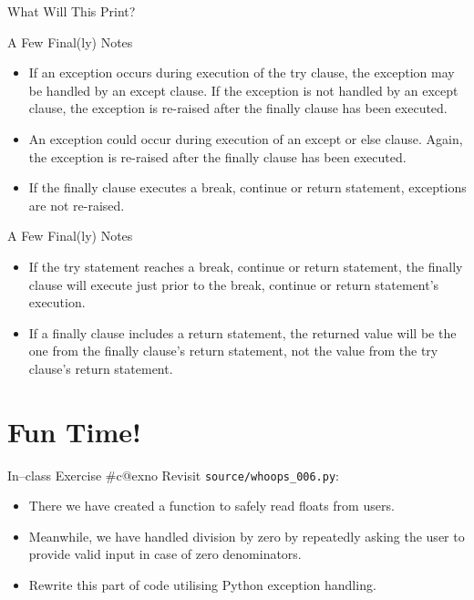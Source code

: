 \documentclass[aspectratio=169, 12pt, xcolor=table]{beamer}
\makeatletter
\newcommand{\arabicthree}[1]{\expandafter\@arabicthree\csname c@#1\endcsname}
\newcommand{\@arabicthree}[1]{\ifnum #1<100 0\fi\ifnum #1<10 0\fi\number#1}
\newcounter{exno}
\newcommand{\exno}{\stepcounter{exno}In--class Exercise \#\arabicthree{exno}}
\makeatother
\begin{document}
	\begin{frame}{What Will This Print?}
		
	\end{frame}

	\begin{frame}{A Few Final(ly) Notes}
		\begin{itemize}
			\item If an exception occurs during execution of the try clause, the exception may be handled by an except clause. If the exception is not handled by an except clause, the exception is re-raised after the finally clause has been executed.
			\item An exception could occur during execution of an except or else clause. Again, the exception is re-raised after the finally clause has been executed.
			\item If the finally clause executes a break, continue or return statement, exceptions are not re-raised.
		\end{itemize}		
	\end{frame}

	\begin{frame}{A Few Final(ly) Notes}
		\begin{itemize}
			\item If the try statement reaches a break, continue or return statement, the finally clause will execute just prior to the break, continue or return statement’s execution.
			\item If a finally clause includes a return statement, the returned value will be the one from the finally clause’s return statement, not the value from the try clause’s return statement.
		\end{itemize}
	\end{frame}
	
	\section{Fun Time!}\label{sec:fun-time}
	
	\sectionframe
	
	\setcounter{exno}{0}
	
	\begin{frame}{\exno}
		Revisit \texttt{source/whoops\_006.py}:
		\begin{itemize}
			\item There we have created a function to safely read floats from users.
			\item Meanwhile, we have handled division by zero by repeatedly asking the user to provide valid input in case of zero denominators.
			\item Rewrite this part of code utilising Python exception handling.
		\end{itemize}
	\end{frame}
\end{document}
